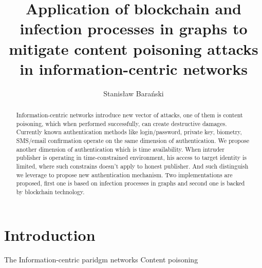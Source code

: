\documentclass[runningheads]{llncs}
\begin{document}
%
\title{Application of blockchain and infection processes in graphs to
mitigate content poisoning attacks in information-centric networks}
%
%
\author{Stanisław Barański}

%
%
\maketitle              %
%
\begin{abstract}
Information-centric networks introduce new vector of attacks, one of them is content poisoning, which when performed successfully, can create destructive damages. Currently known authentication methods like login/password, private key, biometry, SMS/email confirmation operate on the same dimension of authentication. We propose another dimension of authentication which is time availability. When intruder publisher is operating in time-constrained environment, his access to target identity is limited, where such constrains doesn't apply to honest publisher. And such distinguish we leverage to propose new authentication mechanism. Two implementations are proposed, first one is based on infection processes in graphs and second one is backed by blockchain technology. 

\end{abstract}


\section{Introduction}
The Information-centric paridgm networks 
Content poisoning 
\end{document}

